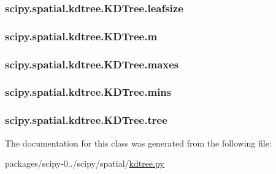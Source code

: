 \subsubsection[{leafsize}]{\setlength{\rightskip}{0pt plus 5cm}scipy.\+spatial.\+kdtree.\+K\+D\+Tree.\+leafsize}\label{classscipy_1_1spatial_1_1kdtree_1_1KDTree_afc6f34f45726bb27be32908d8345de49}
\hypertarget{classscipy_1_1spatial_1_1kdtree_1_1KDTree_a79ba7c07dbc703fd689e82541f44b84c}{}
\subsubsection[{m}]{\setlength{\rightskip}{0pt plus 5cm}scipy.\+spatial.\+kdtree.\+K\+D\+Tree.\+m}\label{classscipy_1_1spatial_1_1kdtree_1_1KDTree_a79ba7c07dbc703fd689e82541f44b84c}
\hypertarget{classscipy_1_1spatial_1_1kdtree_1_1KDTree_aa94c9b4f7ca63474d06e6bcbdd110c9a}{}
\subsubsection[{maxes}]{\setlength{\rightskip}{0pt plus 5cm}scipy.\+spatial.\+kdtree.\+K\+D\+Tree.\+maxes}\label{classscipy_1_1spatial_1_1kdtree_1_1KDTree_aa94c9b4f7ca63474d06e6bcbdd110c9a}
\hypertarget{classscipy_1_1spatial_1_1kdtree_1_1KDTree_a87b8f3b2253d9f73512530535cf40fb4}{}
\subsubsection[{mins}]{\setlength{\rightskip}{0pt plus 5cm}scipy.\+spatial.\+kdtree.\+K\+D\+Tree.\+mins}\label{classscipy_1_1spatial_1_1kdtree_1_1KDTree_a87b8f3b2253d9f73512530535cf40fb4}
\hypertarget{classscipy_1_1spatial_1_1kdtree_1_1KDTree_a885b7950948f0cf39887d406ffe4d456}{}
\subsubsection[{tree}]{\setlength{\rightskip}{0pt plus 5cm}scipy.\+spatial.\+kdtree.\+K\+D\+Tree.\+tree}\label{classscipy_1_1spatial_1_1kdtree_1_1KDTree_a885b7950948f0cf39887d406ffe4d456}


The documentation for this class was generated from the following file\+:\begin{DoxyCompactItemize}
\item 
packages/scipy-\/0../scipy/spatial/\hyperlink{kdtree_8py}{kdtree.\+py}\end{DoxyCompactItemize}
